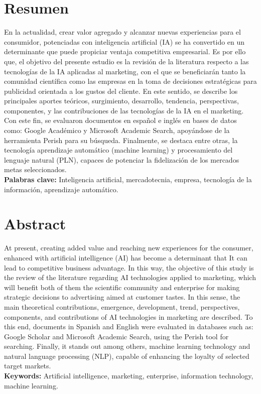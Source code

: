 \documentclass[9pt]{article}
\author[1,*]{\fontsize{9}{9} \textbf{ZAMBRANO NEICER}}
\begin{document}
\maketitle
\section*{Resumen}
\justifying
En la actualidad, crear valor agregado y alcanzar nuevas experiencias para el consumidor, potenciadas con inteligencia artificial (IA) se ha convertido en un determinante que puede propiciar ventaja competitiva empresarial. Es por ello que, el objetivo del presente estudio es la revisión de la literatura respecto a las tecnologías de la IA aplicadas al marketing, con el que se beneficiarán tanto la comunidad científica como las empresas en la toma de decisiones estratégicas para publicidad orientada a los gustos del cliente. En este sentido, se describe los principales aportes teóricos, surgimiento, desarrollo, tendencia, perspectivas, componentes, y las contribuciones de las tecnologías de la IA en el marketing. Con este fin, se evaluaron documentos en español e inglés en bases de datos como: Google Académico y Microsoft Academic Search, apoyándose de la herramienta Perish para su búsqueda. Finalmente, se destaca entre otras, la tecnología aprendizaje automático (machine learning) y procesamiento del lenguaje natural (PLN), capaces de potenciar la fidelización de los mercados metas seleccionados.\\[0.2cm]
\textbf{Palabras clave:} Inteligencia artificial, mercadotecnia, empresa, tecnología de la información, aprendizaje automático.


\section*{Abstract}

\justifying
At present, creating added value and reaching new experiences for the consumer, enhanced  with  artificial  intelligence  (AI)  has  become  a  determinant  that  It  can  lead  to competitive business advantage. In this way, the objective of this study is the review of the literature regarding AI technologies applied to marketing, which will benefit both of them the scientific community and enterprise for making strategic decisions to advertising aimed at customer tastes. In this sense, the main theoretical contributions, emergence, development, trend,  perspectives,  components,  and  contributions  of  AI  technologies  in  marketing  are described. To this end, documents in Spanish and English were evaluated in databases such as: Google Scholar and Microsoft Academic Search, using the Perish tool for searching. Finally, it stands out among others, machine learning technology and natural language processing (NLP), capable of enhancing the loyalty of selected target markets.\\[0.2cm]
\textbf{Keywords:} Artificial  intelligence,  marketing,  enterprise,  information  technology,  machine learning.
\end{document}
